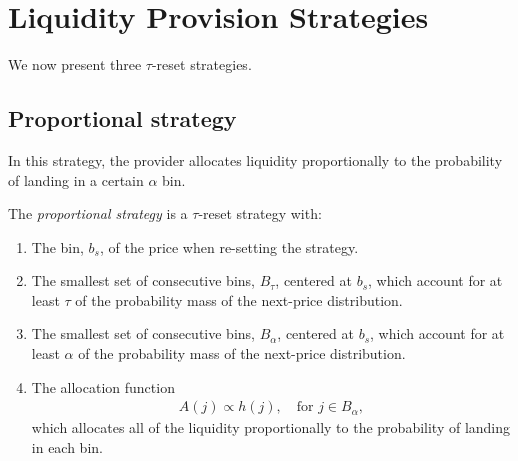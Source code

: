 \documentclass[sigconf, usenames, dvipsnames]{acmart}
\newcommand{\dcp}[1]{\textcolor{blue}{{\scriptsize{David:}}#1}}
\begin{document}
\section{Liquidity Provision Strategies}\label{sec:strats}
We now present three $\tau$-reset strategies.

\subsection{Proportional strategy}\label{sub:prop-adapt}
In this strategy, the provider allocates liquidity proportionally to the probability of landing in a certain $\alpha$ bin. 
\begin{definition}
The \textit{proportional strategy} is a $\tau$-reset strategy with:
\begin{enumerate}
    \item The bin, $b_s$,  of  the  price when re-setting the strategy.
    \item The smallest set of consecutive bins, $B_{\tau}$, centered at $b_s$, which account for at least $\tau$ of the probability mass of the next-price distribution. 
    \item The smallest set of consecutive bins, $B_{\alpha}$, centered at $b_s$, which account for at least $\alpha$ of the probability mass of the next-price distribution.
    \item The allocation function
    \begin{align}
        A(j) \propto  h(j), \quad \text{for } j\in B_{\alpha},
    \end{align}
    which allocates all of the liquidity proportionally to the probability of landing in each bin. 
\end{enumerate}
\end{definition}
\end{document}
